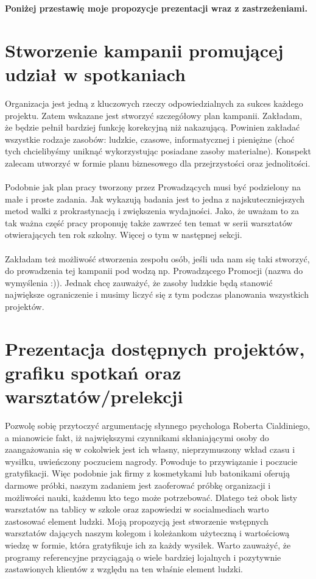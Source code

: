 \documentclass[9pt,a4paper]{report}
\begin{document}
\textbf{Poniżej przestawię moje propozycje prezentacji wraz z zastrzeżeniami.} 

\section{Stworzenie kampanii promującej udział w spotkaniach} 

Organizacja jest jedną z kluczowych rzeczy odpowiedzialnych za sukces każdego projektu. Zatem wskazane jest stworzyć szczegółowy plan kampanii. Zakładam, że będzie pełnił bardziej funkcję korekcyjną niż nakazującą. Powinien zakładać wszystkie rodzaje zasobów: ludzkie, czasowe, informatycznej i pieniężne (choć tych chcielibyśmy uniknąć wykorzystując posiadane zasoby materialne). Konspekt zalecam utworzyć w formie planu biznesowego dla przejrzystości oraz jednolitości.\\\\ 

Podobnie jak plan pracy tworzony przez Prowadzących musi być podzielony na małe i proste zadania. Jak wykazują badania jest to jedna z najskuteczniejszych metod walki z prokrastynacją i zwiększenia wydajności. Jako, że uważam to za tak ważna część pracy proponuję także zawrzeć ten temat w serii warsztatów otwierających ten rok szkolny. Więcej o tym w następnej sekcji.\\\\ 

Zakładam też możliwość stworzenia zespołu osób, jeśli uda nam się taki stworzyć, do prowadzenia tej kampanii pod wodzą np. Prowadzącego Promocji (nazwa do wymyślenia :)). Jednak chcę zauważyć, że zasoby ludzkie będą stanowić największe ograniczenie i musimy liczyć się z tym podczas planowania wszystkich projektów. 

\section{Prezentacja dostępnych projektów, grafiku spotkań oraz warsztatów/prelekcji} 
\label{section:cial} 

Pozwolę sobię przytoczyć argumentację słynnego psychologa Roberta Cialdiniego, a mianowicie fakt, iż największymi czynnikami skłaniającymi osoby do zaangażowania się w cokolwiek jest ich własny, nieprzymuszony wkład czasu i wysiłku, uwieńczony poczuciem nagrody. Powoduje to przywiązanie i poczucie gratyfikacji. Więc podobnie jak firmy z kosmetykami lub batonikami oferują darmowe próbki, naszym zadaniem jest zaoferować próbkę organizacji i możliwości nauki, każdemu kto tego może potrzebować. Dlatego też obok listy warsztatów na tablicy w szkole oraz zapowiedzi w socialmediach warto zastosować element ludzki. Moją propozycją jest stworzenie wstępnych warsztatów dających naszym kolegom i koleżankom użyteczną i wartościową wiedzę w formie, która gratyfikuje ich za każdy wysiłek. Warto zauważyć, że programy referencyjne przyciągają o wiele bardziej lojalnych i pozytywnie zastawionych klientów z względu na ten właśnie element ludzki.\\\\ 
\end{document}
